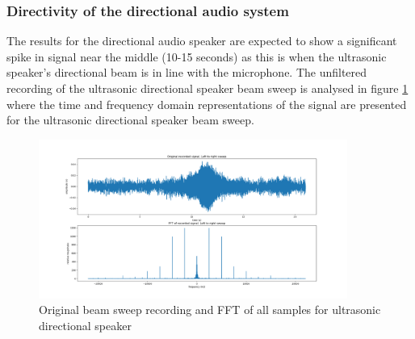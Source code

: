\newpage

\subsubsection{Directivity of the directional audio system}
The results for the directional audio speaker are expected to show a significant spike in signal near the middle (10-15 seconds) as this is when the ultrasonic speaker's directional beam is in line with the microphone.
The unfiltered recording of the ultrasonic directional speaker beam sweep is analysed in figure \ref{fig:unfiltered_usonic_beamsweep} where the time and frequency domain representations of the signal are presented for the ultrasonic directional speaker beam sweep.
\begin{figure}[ht!]
    \centering
    \includegraphics[width=0.9\textwidth]{Figures/Testing/BeamSweep/Ultrasonic_sqr_am/original_sig_fft_amp.png}
    \caption{Original beam sweep recording and FFT of all samples for ultrasonic directional speaker}
    \label{fig:unfiltered_usonic_beamsweep}
\end{figure}


